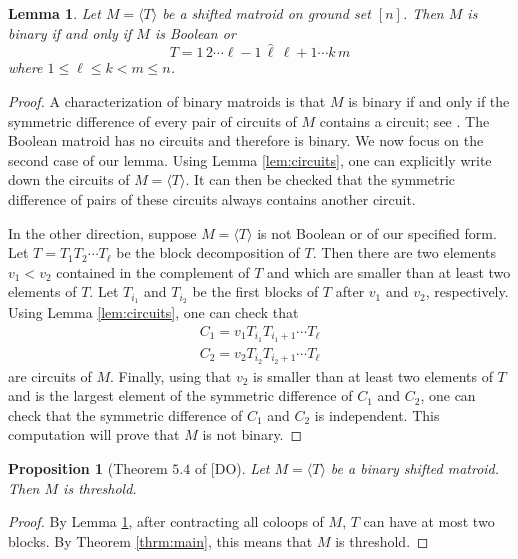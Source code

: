 \documentclass[10pt,a4paper]{amsart}
\makeatletter
\let\laneX@cite\cite
\renewcommand{\cite}{\protect\laneX@citenew}
\newcommand{\laneX@citenew}{\@ifnextchar[{\laneX@cite@a}{\laneX@cite@b}}
\def\laneX@cite@b#1{\laneX@cite{#1}}
\def\laneX@cite@a[#1]{\@ifnextchar[{\laneX@cite@c{#1}}{\laneX@cite@d{#1}}}
\def\laneX@cite@d#1#2{\laneX@cite[#1]{#2}}
\def\laneX@cite@c#1[#2]#3{[\unskip #1 \csname b@#3\endcsname, #2]}
\theoremstyle{definition}
\theoremstyle{plain}
\newtheorem{lemma}[defn]{Lemma}
\newtheorem{prop}[defn]{Proposition}
\makeatother
\begin{document}
\begin{lemma}
\label{lem:binary}
Let $M= \langle T \rangle$ be a shifted matroid on ground set $[n]$. Then $M$ is binary if and only if $M$ is Boolean or
\[T  = 1\,2\cdots \ell-1\, \hat \ell\, \ell+1\cdots k\, m  \]
where $1\leq \ell \leq k < m \leq n$.
\end{lemma}
\begin{proof}
 A characterization of binary matroids is that $M$ is binary if and only if the symmetric difference of every pair of circuits of $M$ contains a circuit; see \cite[Theorem $9.1.2$]{oxley}. The Boolean matroid has no circuits and therefore is binary. We now focus on the second case of our lemma. Using Lemma \ref{lem:circuits}, one can explicitly write down the circuits of $M=\langle T \rangle$. It can then be checked that the symmetric difference of pairs of these circuits always contains another circuit.

In the other direction, suppose $M=\langle T\rangle$ is not Boolean or of our specified form. Let $T=T_1T_2\cdots T_\ell$ be the block decomposition of $T$. Then there are two elements $v_1<v_2$ contained in the complement of $T$ and which are smaller than at least two elements of $T$. Let $T_{i_1}$ and $T_{i_2}$ be the first blocks of $T$ after $v_1$ and $v_2$, respectively. Using Lemma \ref{lem:circuits}, one can check that 
\begin{gather*}
C_1 = v_1 T_{i_1} T_{i_1+1} \cdots T_\ell\\
C_2 = v_2 T_{i_2} T_{i_2+1} \cdots T_\ell
\end{gather*}
are circuits of $M$. Finally, using that $v_2$ is smaller than at least two elements of $T$ and is the largest element of the symmetric difference of $C_1$ and $C_2$, one can check that the symmetric difference of $C_1$ and $C_2$ is independent. This computation will prove that $M$ is not binary.
\end{proof}
\begin{prop}[Theorem $5.4$ of \cite{DO}]
Let $M=\langle T \rangle $ be a binary shifted matroid. Then $M$ is threshold.
\end{prop}
\begin{proof}
By Lemma \ref{lem:binary}, after contracting all coloops of $M$, $T$ can have at most two blocks. By Theorem \ref{thrm:main}, this means that $M$ is threshold.
\end{proof}
\end{document}
